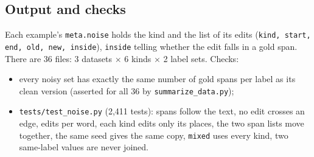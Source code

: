 \documentclass[10pt,a4paper]{article}
\newcommand{\file}[1]{\texttt{#1}}
\begin{document}
\subsection{Output and checks}

Each example's \file{meta.noise} holds the kind and the list of its edits
(\file{kind, start, end, old, new, inside}), \file{inside} telling whether the edit falls in a
gold span. There are 36 files: 3 datasets $\times$ 6 kinds $\times$ 2 label sets. Checks:
\begin{itemize}
\item every noisy set has exactly the same number of gold spans per label as its clean version
  (asserted for all 36 by \file{summarize\_data.py});
\item \file{tests/test\_noise.py} (2,411 tests): spans follow the text, no edit crosses an edge,
  edits per word, each kind edits only its places, the two span lists move together, the same
  seed gives the same copy, \file{mixed} uses every kind, two same-label values are never joined.
\end{itemize}
\end{document}
